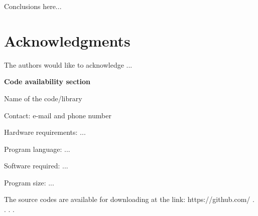 \documentclass[a4paper,fleqn]{cas-sc}
\begin{document}
Conclusions here...

\section{Acknowledgments}

The authors would like to acknowledge ...

\newpage

\textbf{Code availability section}

Name of the code/library

Contact: e-mail and phone number

Hardware requirements: ...

Program language: ...
 
Software required: ...

Program size: ...

The source codes are available for downloading at the link:
https://github.com/ . . . . 



 
\end{document}
